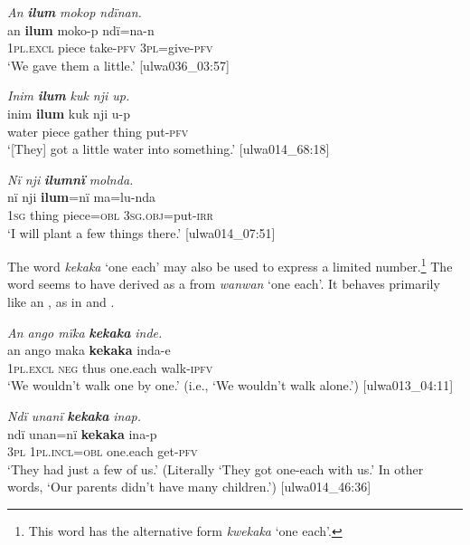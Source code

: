 \ea%
    \label{ex:det:204}
          \textit{An} \textbf{\textit{ilum}} \textit{mokop ndïnan.}\\
\gll    an      \textbf{ilum}  moko-p  ndï=na-n\\
    1\textsc{pl.excl}  piece  take-\textsc{pfv}  3\textsc{pl}=give-\textsc{pfv}\\
\glt `We gave them a little.’ [ulwa036\_03:57]
\z

\ea%
    \label{ex:det:205}
          \textit{Inim} \textbf{\textit{ilum}} \textit{kuk nji up.}\\
\gll    inim  \textbf{ilum}  kuk  nji    u-p\\
    water  piece  gather  thing  put-\textsc{pfv}\\
\glt `[They] got a little water into something.’ [ulwa014\_68:18]
\z

\ea%
    \label{ex:det:206}
          \textit{Nï nji} \textbf{\textit{ilumnï}} \textit{molnda.}\\
\gll    nï    nji    \textbf{ilum}=nï  ma=lu-nda\\
    1\textsc{sg}  thing  piece=\textsc{obl}  3\textsc{sg.obj}=put-\textsc{irr}\\
\glt `I will plant a few things there.’ [ulwa014\_07:51]
\z

The word \textit{kekaka} ‘one each’ may also be used to express a limited number.\footnote{This word has the alternative form \textit{kwekaka} ‘one each’.} The word seems to have derived as a  from  \textit{wanwan} ‘one each’. It behaves primarily like an , as in  and .


\ea%
    \label{ex:det:207}
          \textit{An ango mïka} \textbf{\textit{kekaka}} \textit{inde.}\\
\gll    an      ango  maka  \textbf{kekaka}  inda-e\\
    1\textsc{pl.excl}  \textsc{neg}  thus  one.each  walk-\textsc{ipfv}\\
\glt `We wouldn’t walk one by one.’ (i.e., ‘We wouldn’t walk alone.’) [ulwa013\_04:11]
\z

\ea%
    \label{ex:det:208}
          \textit{Ndï unanï} \textbf{\textit{kekaka}} \textit{inap.}\\
\gll    ndï  unan=nï    \textbf{kekaka}  ina-p\\
    3\textsc{pl}  1\textsc{pl.incl=obl}  one.each  get-\textsc{pfv}\\
\glt `They had just a few of us.’ (Literally ‘They got one-each with us.’ In other words, ‘Our parents didn’t have many children.’) [ulwa014\_46:36]
\z

